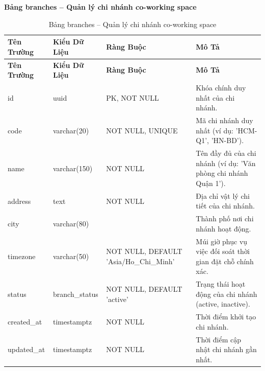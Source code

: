 \textbf{Bảng branches -- Quản lý chi nhánh co-working space}
\label{table:branches}
\begin{longtable}{|p{3cm}|p{2.5cm}|p{3.5cm}|p{5cm}|}
\caption{Bảng branches -- Quản lý chi nhánh co-working space} \\
\hline
\textbf{Tên Trường} & \textbf{Kiểu Dữ Liệu} & \textbf{Ràng Buộc} & \textbf{Mô Tả} \\
\hline
\endfirsthead
\hline
\textbf{Tên Trường} & \textbf{Kiểu Dữ Liệu} & \textbf{Ràng Buộc} & \textbf{Mô Tả} \\
\hline
\endhead
id & uuid & PK, NOT NULL & Khóa chính duy nhất của chi nhánh. \\
\hline
code & varchar(20) & NOT NULL, UNIQUE & Mã chi nhánh duy nhất (ví dụ: 'HCM-Q1', 'HN-BD'). \\
\hline
name & varchar(150) & NOT NULL & Tên đầy đủ của chi nhánh (ví dụ: 'Văn phòng chi nhánh Quận 1'). \\
\hline
address & text & NOT NULL & Địa chỉ vật lý chi tiết của chi nhánh. \\
\hline
city & varchar(80) & & Thành phố nơi chi nhánh hoạt động. \\
\hline
timezone & varchar(50) & NOT NULL, DEFAULT 'Asia/Ho\_Chi\_Minh' & Múi giờ phục vụ việc đối soát thời gian đặt chỗ chính xác. \\
\hline
status & branch\_status & NOT NULL, DEFAULT 'active' & Trạng thái hoạt động của chi nhánh (active, inactive). \\
\hline
created\_at & timestamptz & NOT NULL & Thời điểm khởi tạo chi nhánh. \\
\hline
updated\_at & timestamptz & NOT NULL & Thời điểm cập nhật chi nhánh gần nhất. \\
\hline
\end{longtable}

